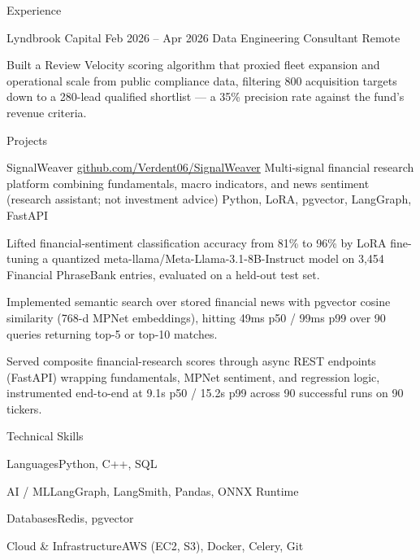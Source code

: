 \documentclass[
	11pt
]{../../../template}
\begin{document}
\begin{rSection}{E}{xperience}
		\begin{rSectionEntry}
			{Lyndbrook Capital}
			{Feb 2026 -- Apr 2026}
			{Data Engineering Consultant}
			{}
			{Remote}

			\item Built a Review Velocity scoring algorithm that proxied fleet expansion and operational scale from public compliance data, filtering 800 acquisition targets down to a 280-lead qualified shortlist --- a 35\% precision rate against the fund's revenue criteria.
		\end{rSectionEntry}
	\end{rSection}

	\begin{rSection}{P}{rojects}
		\begin{rSectionEntry}
			{SignalWeaver}
			{\href{https://github.com/Verdent06/SignalWeaver}{github.com/Verdent06/SignalWeaver}}
			{Multi-signal financial research platform combining fundamentals, macro indicators, and news sentiment (research assistant; not investment advice)}
			{Python, LoRA, pgvector, LangGraph, FastAPI}
			{}

			\item Lifted financial-sentiment classification accuracy from 81\% to 96\% by LoRA fine-tuning a quantized meta-llama/Meta-Llama-3.1-8B-Instruct model on 3,454 Financial PhraseBank entries, evaluated on a held-out test set.
			\item Implemented semantic search over stored financial news with pgvector cosine similarity (768-d MPNet embeddings), hitting 49ms p50 / 99ms p99 over 90 queries returning top-5 or top-10 matches.
			\item Served composite financial-research scores through async REST endpoints (FastAPI) wrapping fundamentals, MPNet sentiment, and regression logic, instrumented end-to-end at 9.1s p50 / 15.2s p99 across 90 successful runs on 90 tickers.
		\end{rSectionEntry}
	\end{rSection}

	\begin{rSection}{T}{echnical Skills}
		\begin{rSet}{Languages}{Python, C++, SQL}
		\end{rSet}
		\begin{rSet}{AI / ML}{LangGraph, LangSmith, Pandas, ONNX Runtime}
		\end{rSet}
		\begin{rSet}{Databases}{Redis, pgvector}
		\end{rSet}
		\begin{rSet}{Cloud \& Infrastructure}{AWS (EC2, S3), Docker, Celery, Git}
		\end{rSet}
	\end{rSection}
\end{document}
